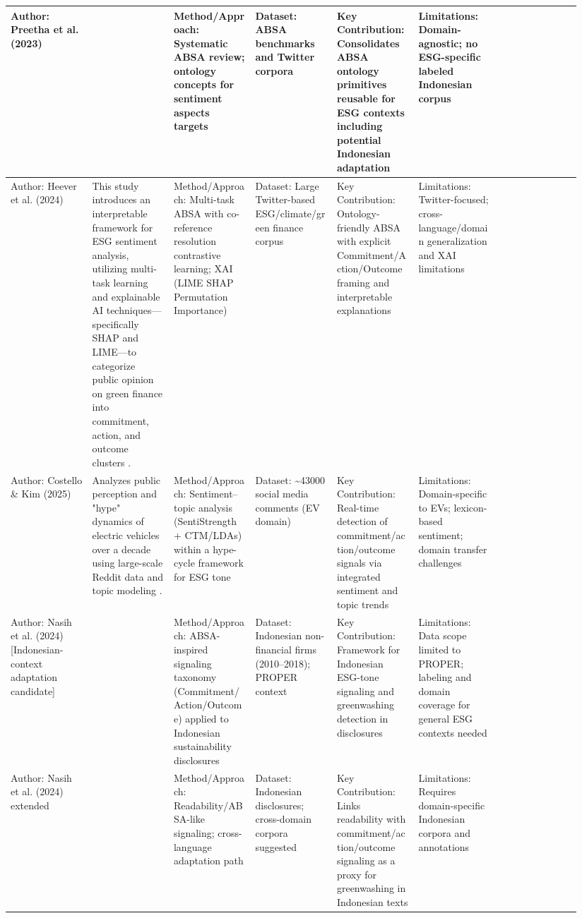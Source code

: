 \documentclass{article}
\begin{document}
\begin{landscape}
\begin{longtable}{p{0.134\linewidth} p{0.134\linewidth} p{0.134\linewidth} p{0.134\linewidth} p{0.134\linewidth} p{0.134\linewidth} p{0.134\linewidth}}
Author: Preetha et al. (2023) & ~ & Method/Approach: Systematic ABSA review; ontology concepts for sentiment aspects targets & Dataset: ABSA benchmarks and Twitter corpora & Key Contribution: Consolidates ABSA ontology primitives reusable for ESG contexts including potential Indonesian adaptation & Limitations: Domain-agnostic; no ESG-specific labeled Indonesian corpus \\ \hline
Author: Heever et al. (2024) & This study introduces an interpretable framework for ESG sentiment analysis, utilizing multi-task learning and explainable AI techniques—specifically SHAP and LIME—to categorize public opinion on green finance into commitment, action, and outcome clusters  \parencite{wihan_van_der_heever_44c76c99}. & Method/Approach: Multi-task ABSA with co-reference resolution contrastive learning; XAI (LIME SHAP Permutation Importance) & Dataset: Large Twitter-based ESG/climate/green finance corpus & Key Contribution: Ontology-friendly ABSA with explicit Commitment/Action/Outcome framing and interpretable explanations & Limitations: Twitter-focused; cross-language/domain generalization and XAI limitations \\ \hline
Author: Costello \& Kim (2025) & Analyzes public perception and "hype" dynamics of electric vehicles over a decade using large-scale Reddit data and topic modeling  \parencite{tao_ruan_824a9480}. & Method/Approach: Sentiment–topic analysis (SentiStrength + CTM/LDAs) within a hype-cycle framework for ESG tone & Dataset: \textasciitilde{}43000 social media comments (EV domain) & Key Contribution: Real-time detection of commitment/action/outcome signals via integrated sentiment and topic trends & Limitations: Domain-specific to EVs; lexicon-based sentiment; domain transfer challenges \\ \hline
Author: Nasih et al. (2024) [Indonesian-context adaptation candidate] & ~ & Method/Approach: ABSA-inspired signaling taxonomy (Commitment/Action/Outcome) applied to Indonesian sustainability disclosures & Dataset: Indonesian non-financial firms (2010–2018); PROPER context & Key Contribution: Framework for Indonesian ESG-tone signaling and greenwashing detection in disclosures & Limitations: Data scope limited to PROPER; labeling and domain coverage for general ESG contexts needed \\ \hline
Author: Nasih et al. (2024) extended & ~ & Method/Approach: Readability/ABSA-like signaling; cross-language adaptation path & Dataset: Indonesian disclosures; cross-domain corpora suggested & Key Contribution: Links readability with commitment/action/outcome signaling as a proxy for greenwashing in Indonesian texts & Limitations: Requires domain-specific Indonesian corpora and annotations \\ \hline

\end{longtable}
\end{landscape}
\end{document}
